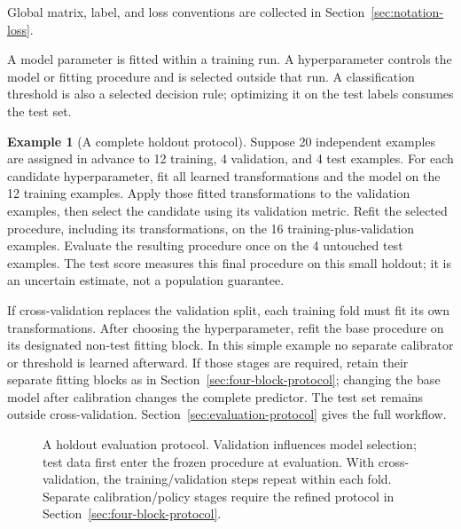 \documentclass[11pt,twoside]{article}
\numberwithin{equation}{section}
\theoremstyle{plain}
\theoremstyle{definition}
\newtheorem{example}[theorem]{Example}
\theoremstyle{remark}
\begin{document}
Global matrix, label, and loss conventions are collected in Section~\ref{sec:notation-loss}.

A model parameter is fitted within a training run. A hyperparameter controls the model or fitting procedure and is selected outside that run. A classification threshold is also a selected decision rule; optimizing it on the test labels consumes the test set.

\begin{example}[A complete holdout protocol]
Suppose 20 independent examples are assigned in advance to 12 training, 4 validation, and 4 test examples. For each candidate hyperparameter, fit all learned transformations and the model on the 12 training examples. Apply those fitted transformations to the validation examples, then select the candidate using its validation metric. Refit the selected procedure, including its transformations, on the 16 training-plus-validation examples. Evaluate the resulting procedure once on the 4 untouched test examples. The test score measures this final procedure on this small holdout; it is an uncertain estimate, not a population guarantee.

If cross-validation replaces the validation split, each training fold must fit its own transformations. After choosing the hyperparameter, refit the base procedure on its designated non-test fitting block. In this simple example no separate calibrator or threshold is learned afterward. If those stages are required, retain their separate fitting blocks as in Section~\ref{sec:four-block-protocol}; changing the base model after calibration changes the complete predictor. The test set remains outside cross-validation. Section~\ref{sec:evaluation-protocol} gives the full workflow.
\end{example}

\begin{figure}[H]
\centering
{}
\caption{A holdout evaluation protocol. Validation influences model selection; test data first enter the frozen procedure at evaluation. With cross-validation, the training/validation steps repeat within each fold. Separate calibration/policy stages require the refined protocol in Section~\ref{sec:four-block-protocol}.}
\label{fig:holdout-protocol}
\end{figure}
\end{document}
